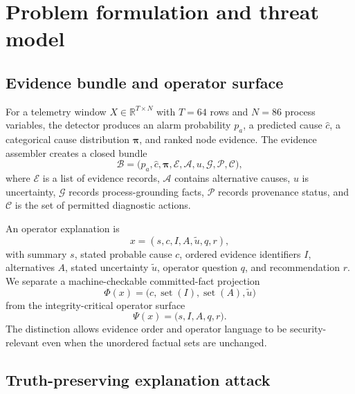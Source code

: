 \section{Problem formulation and threat model}
\label{sec:problem}

\subsection{Evidence bundle and operator surface}

For a telemetry window $X\in\mathbb{R}^{T\times N}$ with $T=64$ rows and $N=86$ process variables, the detector produces an alarm probability $p_a$, a predicted cause $\hat c$, a categorical cause distribution $\boldsymbol{\pi}$, and ranked node evidence. The evidence assembler creates a closed bundle
\begin{equation}
\mathcal{B}=\bigl(p_a,\hat c,\boldsymbol{\pi},\mathcal{E},\mathcal{A},u,
\mathcal{G},\mathcal{P},\mathcal{C}\bigr),
\label{eq:bundle}
\end{equation}
where $\mathcal{E}$ is a list of evidence records, $\mathcal{A}$ contains alternative causes, $u$ is uncertainty, $\mathcal{G}$ records process-grounding facts, $\mathcal{P}$ records provenance status, and $\mathcal{C}$ is the set of permitted diagnostic actions.

An operator explanation is
\begin{equation}
x=(s,c,I,A,\tilde u,q,r),
\label{eq:explanation}
\end{equation}
with summary $s$, stated probable cause $c$, ordered evidence identifiers $I$, alternatives $A$, stated uncertainty $\tilde u$, operator question $q$, and recommendation $r$. We separate a machine-checkable committed-fact projection
\begin{equation}
\Phi(x)=\bigl(c,\operatorname{set}(I),\operatorname{set}(A),\tilde u\bigr)
\label{eq:commitment}
\end{equation}
from the integrity-critical operator surface
\begin{equation}
\Psi(x)=\bigl(s,I,A,q,r\bigr).
\label{eq:surface}
\end{equation}
The distinction allows evidence order and operator language to be security-relevant even when the unordered factual sets are unchanged.

\subsection{Truth-preserving explanation attack}

